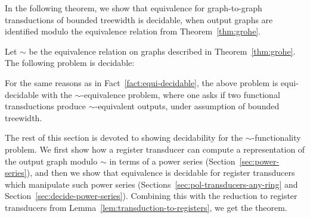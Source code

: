 In the following theorem, we show that equivalence for graph-to-graph \mso transductions of bounded treewidth is decidable, when output graphs are identified modulo the equivalence relation from Theorem~\ref{thm:grohe}. 
\begin{theorem}\label{thm:path-equivalence}
    Let $\sim$ be the equivalence relation on graphs described in Theorem~\ref{thm:grohe}. 
    The following problem is decidable:
\end{theorem}
 
For the same reasons as in Fact~\ref{fact:equi-decidable}, the above problem is equi-decidable with the $\sim$-equivalence problem, where one asks if two functional transductions produce $\sim$-equivalent outputs, under assumption of bounded treewidth. 

The rest of this section is devoted to showing decidability for the  $\sim$-functionality problem. We first show how a register transducer can compute a representation of the output graph modulo $\sim$ in terms of a power series (Section~\ref{sec:power-series}), and then we show that equivalence is decidable for register transducers which manipulate such power series (Sections~\ref{sec:pol-transducers-any-ring} and Section~\ref{sec:decide-power-series}). Combining this with the reduction to register transducers from Lemma~\ref{lem:transduction-to-registers}, we get the theorem.

